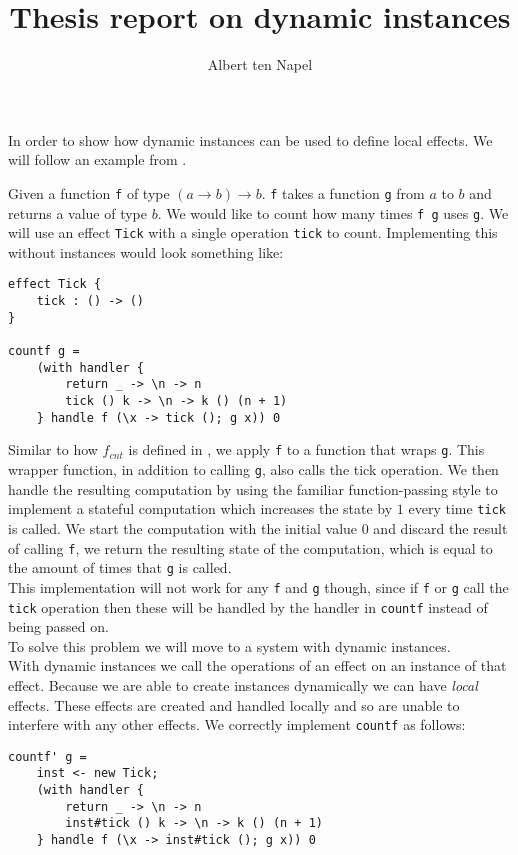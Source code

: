 \documentclass[12pt]{article}
\title{Thesis report on dynamic instances}
\author{Albert ten Napel}
\date{}
\begin{document}
\maketitle

In order to show how dynamic instances can be used to define local effects.
We will follow an example from \cite{handlewithcare}.

Given a function \texttt{f} of type $(a \rightarrow b) \rightarrow b$.
\texttt{f} takes a function \texttt{g} from $a$ to $b$ and returns a value of type $b$.
We would like to count how many times \texttt{f g} uses \texttt{g}.
We will use an effect \texttt{Tick} with a single operation \texttt{tick} to count.
Implementing this without instances would look something like:
\begin{verbatim}
effect Tick {
	tick : () -> ()
}

countf g =
	(with handler {
		return _ -> \n -> n
		tick () k -> \n -> k () (n + 1)
	} handle f (\x -> tick (); g x)) 0
\end{verbatim}
Similar to how $f_{cnt}$ is defined in \cite{handlewithcare}, we apply \texttt{f} to a function that wraps \texttt{g}.
This wrapper function, in addition to calling \texttt{g}, also calls the tick operation.
We then handle the resulting computation by using the familiar function-passing style to implement a stateful computation which
increases the state by $1$ every time \texttt{tick} is called.
We start the computation with the initial value $0$ and discard the result of calling \texttt{f}, we return the resulting state of the computation, which is equal to the amount of times that \texttt{g} is called.\\
This implementation will not work for any \texttt{f} and \texttt{g} though, since if \texttt{f} or \texttt{g} call the \texttt{tick} operation then these will be handled by the handler in \texttt{countf} instead of being passed on.\\
To solve this problem we will move to a system with dynamic instances.\\
With dynamic instances we call the operations of an effect on an instance of that effect.
Because we are able to create instances dynamically we can have \textit{local} effects.
These effects are created and handled locally and so are unable to interfere with any other effects.
We correctly implement \texttt{countf} as follows:
\begin{verbatim}
countf' g =
	inst <- new Tick;
	(with handler {
		return _ -> \n -> n
		inst#tick () k -> \n -> k () (n + 1)
	} handle f (\x -> inst#tick (); g x)) 0
\end{verbatim}
\end{document}
